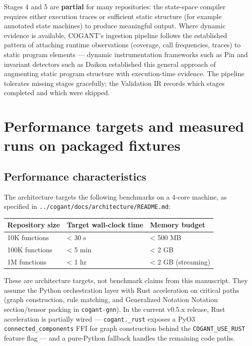 \documentclass[
]{article}
\newcounter{none} %
\begin{document}
Stages 4 and 5 are \textbf{partial} for many repositories: the
state-space compiler requires either execution traces or sufficient
static structure (for example annotated state machines) to produce
meaningful output. Where dynamic evidence is available, COGANT's
ingestion pipeline follows the established pattern of attaching runtime
observations (coverage, call frequencies, traces) to static program
elements --- dynamic instrumentation frameworks such as Pin
\citep{luk2005pin} and invariant detectors such as Daikon
\citep{ernst2007daikon} established this general approach of augmenting
static program structure with execution-time evidence. The pipeline
tolerates missing stages gracefully; the Validation IR records which
stages completed and which were skipped.

\newpage

\section{Performance targets and measured runs on packaged
fixtures}\label{performance-targets-and-measured-runs-on-packaged-fixtures}

\subsection{Performance
characteristics}\label{performance-characteristics}

The architecture targets the following benchmarks on a 4-core machine,
as specified in \texttt{../cogant/docs/architecture/README.md}:

{\def\LTcaptype{none} %
\begin{longtable}[]{@{}lll@{}}
\toprule\noalign{}
Repository size & Target wall-clock time & Memory budget \\
\midrule\noalign{}
\endhead
\bottomrule\noalign{}
\endlastfoot
10K functions & \textless{} 30 s & \textless{} 500 MB \\
100K functions & \textless{} 5 min & \textless{} 2 GB \\
1M functions & \textless{} 1 hr & \textless{} 2 GB (streaming) \\
\end{longtable}
}

These are architecture targets, not benchmark claims from this
manuscript. They assume the Python orchestration layer with Rust
acceleration on critical paths (graph construction, rule matching, and
Generalized Notation Notation section/tensor packing in
\texttt{cogant-gnn}). In the current v0.5.x release, Rust acceleration
is partially wired --- \texttt{cogant.\_rust} exposes a PyO3
\texttt{connected\_components} FFI for graph construction behind the
\texttt{COGANT\_USE\_RUST} feature flag --- and a pure-Python fallback
handles the remaining code paths.
\end{document}
